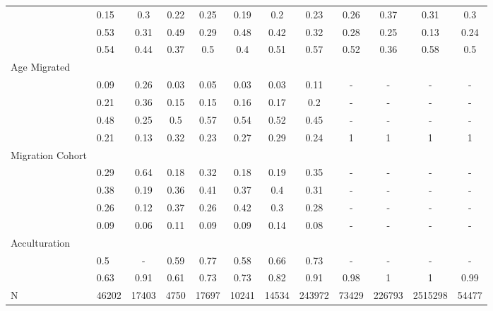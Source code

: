 \documentclass[
]{article}
\begin{document}
\begin{landscape}
\begin{table}[ht]
\begin{tabular}{>{\raggedright\arraybackslash}p{3.2cm}|lcccccc|cccc}
  \multicolumn{1}{>{\raggedleft\arraybackslash}p{2.2cm}|}{\makebox[2.2cm][r]{Lives Alone }}& 0.15 & 0.3 & 0.22 & 0.25 & 0.19 & 0.2 & 0.23 & 0.26 & 0.37 & 0.31 & 0.3 \\ 
  \multicolumn{1}{>{\raggedleft\arraybackslash}p{2.9cm}|}{\makebox[2.9cm][r]{Lives with Child }}& 0.53 & 0.31 & 0.49 & 0.29 & 0.48 & 0.42 & 0.32 & 0.28 & 0.25 & 0.13 & 0.24 \\ 
  \multicolumn{1}{>{\raggedleft\arraybackslash}p{3.4cm}|}{\makebox[3.4cm][r]{Married/Cohabiting }}& 0.54 & 0.44 & 0.37 & 0.5 & 0.4 & 0.51 & 0.57 & 0.52 & 0.36 & 0.58 & 0.5 \\ 
  Age Migrated &  &  &  &  &  &  &  &  &  &  &  \\ 
  \multicolumn{1}{>{\raggedleft\arraybackslash}p{2.4cm}|}{\makebox[2.4cm][r]{Less than 15 }}& 0.09 & 0.26 & 0.03 & 0.05 & 0.03 & 0.03 & 0.11 & - & - & - & - \\ 
  \multicolumn{1}{>{\raggedleft\arraybackslash}p{1.6cm}|}{\makebox[1.6cm][r]{15 - 23 }}& 0.21 & 0.36 & 0.15 & 0.15 & 0.16 & 0.17 & 0.2 & - & - & - & - \\ 
  \multicolumn{1}{>{\raggedleft\arraybackslash}p{1.6cm}|}{\makebox[1.6cm][r]{24 - 49 }}& 0.48 & 0.25 & 0.5 & 0.57 & 0.54 & 0.52 & 0.45 & - & - & - & - \\ 
  \multicolumn{1}{>{\raggedleft\arraybackslash}p{2.6cm}|}{\makebox[2.6cm][r]{50 and Above }}& 0.21 & 0.13 & 0.32 & 0.23 & 0.27 & 0.29 & 0.24 & 1 & 1 & 1 & 1 \\ 
  Migration Cohort &  &  &  &  &  &  &  &  &  &  &  \\ 
  \multicolumn{1}{>{\raggedleft\arraybackslash}p{2.3cm}|}{\makebox[2.3cm][r]{Before 1965 }}& 0.29 & 0.64 & 0.18 & 0.32 & 0.18 & 0.19 & 0.35 & - & - & - & - \\ 
  \multicolumn{1}{>{\raggedleft\arraybackslash}p{2.2cm}|}{\makebox[2.2cm][r]{1965 - 1979 }}& 0.38 & 0.19 & 0.36 & 0.41 & 0.37 & 0.4 & 0.31 & - & - & - & - \\ 
  \multicolumn{1}{>{\raggedleft\arraybackslash}p{2.2cm}|}{\makebox[2.2cm][r]{1980 - 1999 }}& 0.26 & 0.12 & 0.37 & 0.26 & 0.42 & 0.3 & 0.28 & - & - & - & - \\ 
  \multicolumn{1}{>{\raggedleft\arraybackslash}p{2.1cm}|}{\makebox[2.1cm][r]{After 1999 }}& 0.09 & 0.06 & 0.11 & 0.09 & 0.09 & 0.14 & 0.08 & - & - & - & - \\ 
  Acculturation &  &  &  &  &  &  &  &  &  &  &  \\ 
  \multicolumn{1}{>{\raggedleft\arraybackslash}p{1.6cm}|}{\makebox[1.6cm][r]{Citizen }}& 0.5 & - & 0.59 & 0.77 & 0.58 & 0.66 & 0.73 & - & - & - & - \\ 
  \multicolumn{1}{>{\raggedleft\arraybackslash}p{3cm}|}{\makebox[3cm][r]{English Speakers }}& 0.63 & 0.91 & 0.61 & 0.73 & 0.73 & 0.82 & 0.91 & 0.98 & 1 & 1 & 0.99 \\ 
  N & 46202 & 17403 & 4750 & 17697 & 10241 & 14534 & 243972 & 73429 & 226793 & 2515298 & 54477 \\ 
   \hline
\end{tabular}
\endgroup
\end{table}


\end{landscape}
\end{document}
